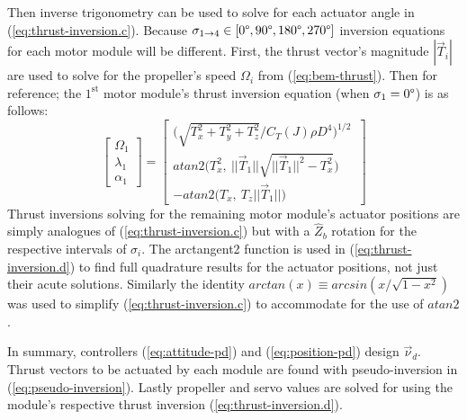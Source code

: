 \documentclass[a4paper, 10pt, conference]{ieeeconf}
\begin{document}
Then inverse trigonometry can be used to solve for each actuator angle in (\ref{eq:thrust-inversion.c}). Because $\sigma_{1\rightarrow 4}\in[0\text{\textdegree},90\text{\textdegree},180\text{\textdegree},270\text{\textdegree}]$ inversion equations for each motor module will be different. First, the thrust vector's magnitude $|\vec{T}_i|$ are used to solve for the propeller's speed $\Omega_i$ from (\ref{eq:bem-thrust}). Then for reference; the $1^{\text{st}}$ motor module's thrust inversion equation (when $\sigma_1=0\text{\textdegree}$) is as follows:
\begin{equation}\label{eq:thrust-inversion.d}
\begin{bmatrix}
\Omega_1\\
\lambda_1\\
\alpha_1
\end{bmatrix}=\begin{bmatrix}
\Big(\sqrt{T_x^2+T_y^2+T_z^2}/C_T(J)\rho D^4\Big)^{1/2}\hspace{2pt}\\
atan2\Big(T_x^2,~||\vec{T}_1||\sqrt{||\vec{T}_1||^2-T_x^2}\text{}\Big)\\
-atan2\Big(T_x,~T_z||\vec{T}_1||\Big)
\end{bmatrix}
\end{equation}
Thrust inversions solving for the remaining motor module's actuator positions are simply analogues of (\ref{eq:thrust-inversion.c}) but with a $\hat{Z}_b$ rotation for the respective intervals of $\sigma_i$. The arctangent2 function is used in (\ref{eq:thrust-inversion.d}) to find full quadrature results for the actuator positions, not just their acute solutions. Similarly the identity $arctan(x)\equiv arcsin(x/\sqrt{1-x^2})$ was used to simplify (\ref{eq:thrust-inversion.c}) to accommodate for the use of $atan2$.
\par
In summary, controllers (\ref{eq:attitude-pd}) and (\ref{eq:position-pd}) design $\vec{\nu}_d$. Thrust vectors to be actuated by each module are found with pseudo-inversion in (\ref{eq:pseudo-inversion}). Lastly propeller and servo values are solved for using the module's respective thrust inversion (\ref{eq:thrust-inversion.d}).
\end{document}
